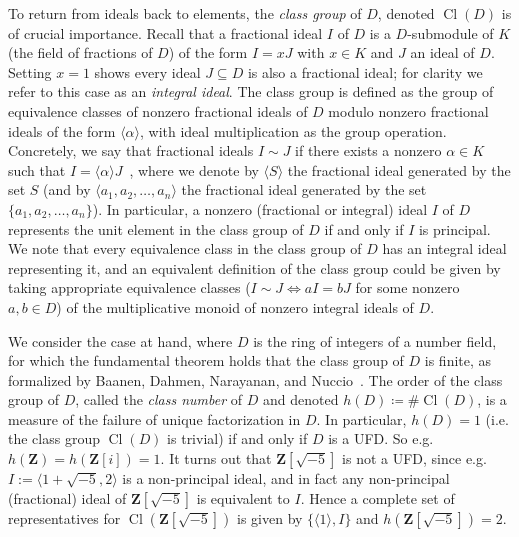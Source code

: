\documentclass[sigplan,10pt,nonacm,
screen]{acmart} \settopmatter{printfolios=true,printccs=false,printacmref=false}
\newcommand{\ZZ}{\mathbf{Z}}
\DeclareMathOperator{\Cl}{Cl}
\begin{document}
To return from ideals back to elements, the \emph{class group} of $D$, denoted $\Cl(D)$ is of crucial importance.
Recall that a fractional ideal $I$ of $D$ is a $D$-submodule of $K$ (the field of fractions of $D$) of the form $I=x J$ with $x \in K$ and $J$ an ideal of $D$.
Setting $x = 1$ shows every ideal $J \subseteq D$ is also a fractional ideal; for clarity we refer to this case as an \emph{integral ideal}.
The class group is defined as the group of equivalence classes of nonzero fractional ideals of $D$ modulo nonzero fractional ideals of the form $\langle \alpha \rangle$, with ideal multiplication as the group operation.
Concretely, we say that fractional ideals $I \sim J$ if there exists a nonzero $\alpha \in K$ such that $ I = \langle \alpha \rangle J $~\cite[Section 2]{baanen_formalization_2021},
where we denote by $ \langle S \rangle$ the fractional ideal generated by the set $S$
(and by $\langle a_1, a_2, \dots, a_n\rangle$ the fractional ideal generated by the set $\{a_1, a_2, \dots, a_n\}$).
In particular, a nonzero (fractional or integral) ideal $I$ of $D$ represents the unit element in the class group of $D$ if and only if $I$ is principal.
We note that every equivalence class in the class group of $D$ has an integral ideal representing it,
and an equivalent definition of the class group could be given by taking appropriate equivalence classes ($I \sim J \Leftrightarrow aI=bJ$ for some nonzero $a,b \in D$) of the multiplicative monoid of nonzero integral ideals of $D$.

We consider the case at hand, where $D$ is the ring of integers of a number field,
for which the fundamental theorem holds that the class group of $D$ is finite,
as formalized by Baanen, Dahmen, Narayanan, and Nuccio~\cite{baanen_formalization_2021}.
The order of the class group of $D$, called the \emph{class number} of $D$ and denoted $h(D)\coloneqq\#\Cl(D)$, is a measure of the failure of unique factorization in $D$. In particular, $h(D)=1$ (i.e. the class group $\Cl(D)$ is trivial) if and only if $D$ is a UFD. So e.g. $h(\ZZ)=h(\ZZ[i])=1$.
It turns out that $\ZZ[\sqrt{-5}]$ is not  a UFD, since e.g. $I:=\langle 1+\sqrt{-5},2\rangle$ is a non-principal ideal, and in fact any non-principal (fractional) ideal of $\ZZ[\sqrt{-5}]$ is equivalent to $I$.
Hence a complete set of representatives for $\Cl(\ZZ[\sqrt{-5}])$ is given by $\{\langle 1 \rangle,I\}$ and $h(\ZZ[\sqrt{-5}])=2$.
\end{document}
